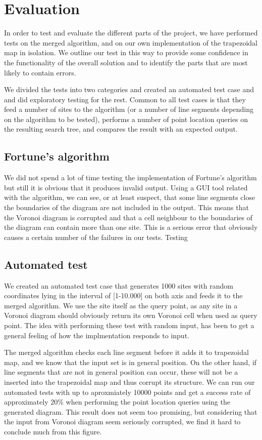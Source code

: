 \section{Evaluation}
In order to test and evaluate the different parts of the project, we have performed tests on the merged algorithm, and on our own implementation of the trapezoidal map in isolation. We outline our test in this way to provide some confidence in the functionality of the overall solution and to identify the parts that are most likely to contain errors. 

We divided the tests into two categories and created an automated test case and and did exploratory testing for the rest. Common to all test cases is that they feed a number of sites to the algorithm (or a number of line segments depending on the algorithm to be tested), performs a number of point location queries on the resulting search tree, and compares the result with an expected output.

\subsection{Fortune’s algorithm}
We did not spend a lot of time testing the implementation of Fortune’s algorithm but still it is obvious that it produces invalid output. Using a GUI tool related with the algorithm, we can see, or at least suspect, that some line segments close the boundaries of the diagram are not included in the output. This means that the Voronoi diagram is corrupted and that a cell neighbour to the boundaries of the diagram can contain more than one site. This is a serious error that obviously causes a certain number of the failures in our tests. Testing 

\subsection{Automated test}
We created an automated test case that generates 1000 sites with random coordinates lying in the interval of [1-10.000] on both axis and feeds it to the merged algorithm. We use the site itself as the query point, as any site in a Voronoi diagram should obviously return its own Voronoi cell when used as query point. The idea with performing these test with random input, has been to get a general feeling of how the implmentation responds to input.

The merged algorithm checks each line segment before it adds it to trapezoidal map, and we know that the input set is in general position. On the other hand, if line segments that are not in general position can occur, these will not be a inserted into the trapezoidal map and thus corrupt its structure. We can run our automated tests with up to aproxmiately 10000 points and get a success rate of approximately 20\% when performing the point location queries using the generated diagram. This result does not seem too promising, but considering that the input from Voronoi diagram seem seriously corrupted, we find it hard to conclude much from this figure. 

